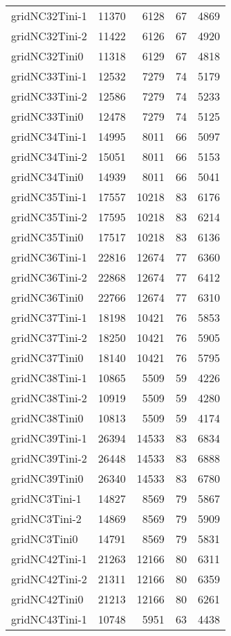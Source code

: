 \begin{longtable}{lrrrr}
gridNC32Tini-1 & 11370 & 6128 & 67 & 4869 \\
gridNC32Tini-2 & 11422 & 6126 & 67 & 4920 \\
gridNC32Tini0 & 11318 & 6129 & 67 & 4818 \\
gridNC33Tini-1 & 12532 & 7279 & 74 & 5179 \\
gridNC33Tini-2 & 12586 & 7279 & 74 & 5233 \\
gridNC33Tini0 & 12478 & 7279 & 74 & 5125 \\
gridNC34Tini-1 & 14995 & 8011 & 66 & 5097 \\
gridNC34Tini-2 & 15051 & 8011 & 66 & 5153 \\
gridNC34Tini0 & 14939 & 8011 & 66 & 5041 \\
gridNC35Tini-1 & 17557 & 10218 & 83 & 6176 \\
gridNC35Tini-2 & 17595 & 10218 & 83 & 6214 \\
gridNC35Tini0 & 17517 & 10218 & 83 & 6136 \\
gridNC36Tini-1 & 22816 & 12674 & 77 & 6360 \\
gridNC36Tini-2 & 22868 & 12674 & 77 & 6412 \\
gridNC36Tini0 & 22766 & 12674 & 77 & 6310 \\
gridNC37Tini-1 & 18198 & 10421 & 76 & 5853 \\
gridNC37Tini-2 & 18250 & 10421 & 76 & 5905 \\
gridNC37Tini0 & 18140 & 10421 & 76 & 5795 \\
gridNC38Tini-1 & 10865 & 5509 & 59 & 4226 \\
gridNC38Tini-2 & 10919 & 5509 & 59 & 4280 \\
gridNC38Tini0 & 10813 & 5509 & 59 & 4174 \\
gridNC39Tini-1 & 26394 & 14533 & 83 & 6834 \\
gridNC39Tini-2 & 26448 & 14533 & 83 & 6888 \\
gridNC39Tini0 & 26340 & 14533 & 83 & 6780 \\
gridNC3Tini-1 & 14827 & 8569 & 79 & 5867 \\
gridNC3Tini-2 & 14869 & 8569 & 79 & 5909 \\
gridNC3Tini0 & 14791 & 8569 & 79 & 5831 \\
gridNC42Tini-1 & 21263 & 12166 & 80 & 6311 \\
gridNC42Tini-2 & 21311 & 12166 & 80 & 6359 \\
gridNC42Tini0 & 21213 & 12166 & 80 & 6261 \\
gridNC43Tini-1 & 10748 & 5951 & 63 & 4438 \\

\end{longtable}
